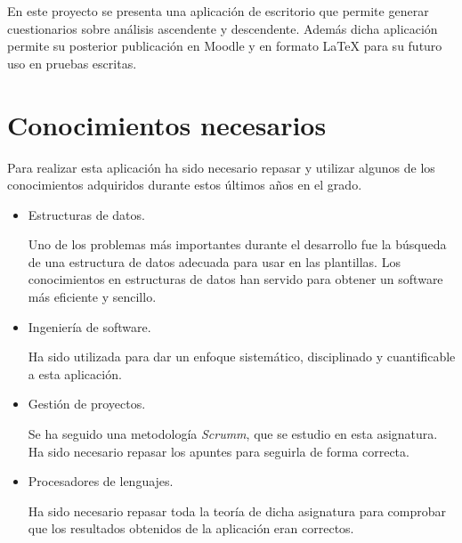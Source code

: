 En este proyecto se presenta una aplicación de escritorio que permite generar cuestionarios sobre análisis ascendente y descendente. Además dicha aplicación permite su posterior publicación en Moodle y en formato \LaTeX{} para su futuro uso en pruebas escritas.


\section{Conocimientos necesarios}
Para realizar esta aplicación ha sido necesario repasar y utilizar algunos de los conocimientos adquiridos durante estos últimos años en el grado.


\begin{itemize}
\item Estructuras de datos.

Uno de los problemas más importantes durante el desarrollo fue la búsqueda de una estructura de datos adecuada para usar en las plantillas. Los conocimientos en estructuras de datos han servido para obtener un software más eficiente y sencillo.
\item Ingeniería de software.

Ha sido utilizada para dar un enfoque sistemático, disciplinado y cuantificable a esta aplicación.

\item Gestión de proyectos.

Se ha seguido una metodología \textit{Scrumm}, que se estudio en esta asignatura. Ha sido necesario repasar los apuntes para seguirla de forma correcta.

\item Procesadores de lenguajes.

Ha sido necesario repasar toda la teoría de dicha asignatura para comprobar que los resultados obtenidos de la aplicación eran correctos.

\end{itemize}  
